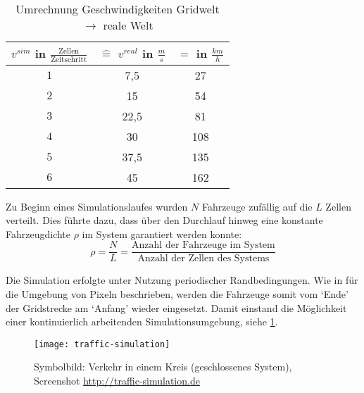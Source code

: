 \begin{table}[ht]
\begin{center}
\setlength{\tabcolsep}{0.5em} %
{\renewcommand{\arraystretch}{1.2}%
\begin{tabular}{| c | c | c |}
\hline 
$v^{sim}$ in $\frac{\text{Zellen}}{\text{Zeitschritt}}$ & $\widehat{=}$ $v^{real}$ in $\frac{m}{s}$ & $=$ in $\frac{km}{h}$ \\ \hline 
$1$ & 7,5 & 27 \\ \hline
$2$ & 15 & 54 \\ \hline
$3$ & 22,5 & 81 \\ \hline
$4$ & 30 & 108 \\ \hline
$5$ & 37,5 & 135 \\ \hline
$6$ & 45 & 162 \\ \hline
\end{tabular}
}
\caption{Umrechnung Geschwindigkeiten Gridwelt $\rightarrow$ reale Welt}
\end{center}
\label{tab:umrechnung-zelle-kmh}
\end{table}

Zu Beginn eines Simulationslaufes wurden $N$ Fahrzeuge zufällig auf die $L$ Zellen verteilt.
Dies führte dazu, dass über den Durchlauf hinweg eine konstante Fahrzeugdichte $\rho$ im System garantiert werden konnte:
\begin{equation}
\rho = \dfrac{N}{L} = \dfrac{\text{Anzahl der Fahrzeuge im System}}{\text{Anzahl der Zellen des Systems}}
\nonumber
\end{equation}

\noindent
Die Simulation erfolgte unter Nutzung periodischer Randbedingungen. 
Wie in \cite[Abb. 1.5]{peri-rand} für die Umgebung von Pixeln beschrieben, werden die Fahrzeuge somit vom \enquote*{Ende} der Gridstrecke am \enquote*{Anfang} wieder eingesetzt. 
Damit einstand die Möglichkeit einer kontinuierlich arbeitenden Simulationsumgebung, siehe \cref{figure:traffic-simulation}.
\begin{figure}[hptb]
 \centering
 \texttt{[image: traffic-simulation]}
 \caption[Darstellung des Verkehrs in einem geschlossenen System]
 		{Symbolbild: Verkehr in einem Kreis (geschlossenes System), Screenshot \url{http://traffic-simulation.de}}
 \label{figure:traffic-simulation}
\end{figure} 



